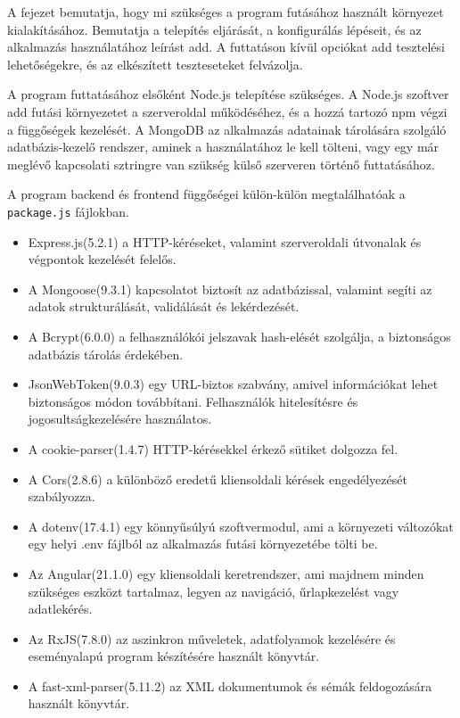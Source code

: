 
A fejezet bemutatja, hogy mi szükséges a program futásához használt környezet kialakításához. Bemutatja a telepítés eljárását, a konfigurálás lépéseit, és az alkalmazás használatához leírást add. A futtatáson kívül opciókat add tesztelési lehetőségekre, és az elkészített teszteseteket  felvázolja.

\label{sec:dependencies}

A program futtatásához elsőként Node.js telepítése szükséges. A Node.js szoftver add futási környezetet a szerveroldal működéséhez, és a hozzá tartozó npm végzi a függőségek kezelését. A MongoDB az alkalmazás adatainak tárolására szolgáló adatbázis-kezelő rendszer, aminek a használatához le kell tölteni, vagy egy már meglévő kapcsolati sztringre van szükség külső szerveren történő futtatásához.

A program backend és frontend függőségei külön-külön megtalálhatóak a \texttt{package.js} fájlokban.


\begin{itemize}
\item Express.js(5.2.1) a HTTP-kéréseket, valamint szerveroldali útvonalak és végpontok kezelését felelős.
\item A Mongoose(9.3.1) kapcsolatot biztosít az adatbázissal, valamint segíti az adatok strukturálását, validálását és lekérdezését.
\item A Bcrypt(6.0.0) a felhasználókói jelszavak hash-elését szolgálja, a biztonságos adatbázis tárolás érdekében.
\item JsonWebToken(9.0.3) egy URL-biztos szabvány, amivel információkat lehet biztonságos módon továbbítani. Felhasználók hitelesítésre és jogosultságkezelésére használatos.
\item A cookie-parser(1.4.7) HTTP-kérésekkel érkező sütiket dolgozza fel.
\item A Cors(2.8.6) a különböző eredetű kliensoldali kérések engedélyezését szabályozza.
\item A dotenv(17.4.1) egy könnyűsúlyú szoftvermodul, ami a környezeti változókat egy helyi .env fájlból az alkalmazás futási környezetébe tölti be. 
\end{itemize}


\begin{itemize}
\item Az Angular(21.1.0) egy kliensoldali keretrendszer, ami majdnem minden szükséges eszközt tartalmaz, legyen az navigáció, űrlapkezelést vagy adatlekérés.
\item Az RxJS(7.8.0) az aszinkron műveletek, adatfolyamok kezelésére és eseményalapú program készítésére használt könyvtár.
\item A fast-xml-parser(5.11.2) az XML dokumentumok és sémák feldogozására használt könyvtár.
\end{itemize}

